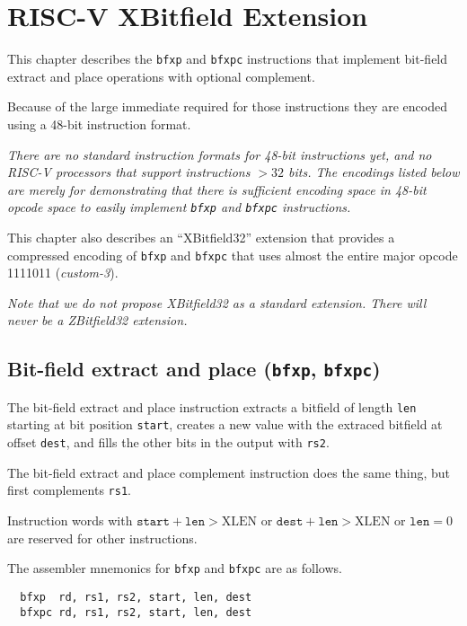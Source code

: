 \chapter{RISC-V XBitfield Extension}
\label{bfxp}

This chapter describes the {\tt bfxp} and {\tt bfxpc} instructions that implement
bit-field extract and place operations with optional complement.

Because of the large immediate required for those instructions they are encoded
using a 48-bit instruction format.

{\it There are no standard instruction formats for 48-bit instructions yet, and
no RISC-V processors that support instructions $>32$ bits. The encodings listed
below are merely for demonstrating that there is sufficient encoding space in
48-bit opcode space to easily implement {\tt bfxp} and {\tt bfxpc}
instructions.}

This chapter also describes an ``XBitfield32'' extension that provides a compressed
encoding of {\tt bfxp} and {\tt bfxpc} that uses almost the entire major opcode
1111011 ({\it custom-3}).

{\it Note that we do not propose XBitfield32 as a standard extension. There
will never be a ZBitfield32 extension.}

\section{Bit-field extract and place ({\tt bfxp}, {\tt bfxpc})}

The bit-field extract and place instruction extracts a bitfield of length
{\tt len} starting at bit position {\tt start}, creates a new value with
the extraced bitfield at offset {\tt dest}, and fills the other bits
in the output with {\tt rs2}.

The bit-field extract and place complement instruction does the same thing,
but first complements {\tt rs1}.

Instruction words with $\texttt{start}+\texttt{len}>\textrm{XLEN}$ or
$\texttt{dest}+\texttt{len}>\textrm{XLEN}$ or $\texttt{len} = 0$ are
reserved for other instructions.



The assembler mnemonics for {\tt bfxp} and {\tt bfxpc} are as follows.

\begin{verbatim}
  bfxp  rd, rs1, rs2, start, len, dest
  bfxpc rd, rs1, rs2, start, len, dest
\end{verbatim}

